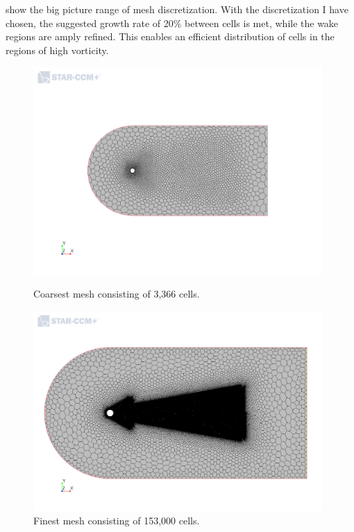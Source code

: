 \documentclass[10pt,english]{article}
\begin{document}
 show the big picture range of mesh discretization.  With the discretization I have chosen, the suggested growth rate of 20\% between cells is met, while the wake regions are amply refined.  This enables an efficient distribution of cells in the regions of high vorticity. 

\begin{figure}[h]
\centering
\begin{minipage}{.49\textwidth}
  \centering
\includegraphics[trim={7.0cm 7.5cm 7.5cm 6.5cm},clip,width=0.98\textwidth]{cylinder_2_1_MeshScene2.png}
\caption{Coarsest mesh consisting of 3,366 cells.}
\label{f:cylinder_2_1_MeshScene2}
\end{minipage}%
\hspace{5pt}
\begin{minipage}{.49\textwidth}
  \centering
\includegraphics[trim={1.5cm 3.9cm 2.5cm 2.7cm},clip,width=0.98\textwidth]{cylinder_2_625_MeshScene2.png}
\caption{\vspace{0pt}Finest mesh consisting of 153,000 cells.}
\label{f:cylinder_2_625_MeshScene2}
\end{minipage}
\end{figure}
\end{document}
